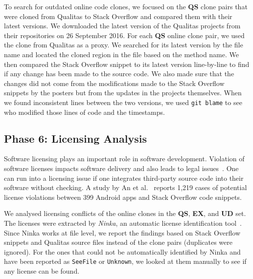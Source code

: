 \documentclass[sigconf,review, anonymous]{acmart}
\begin{document}
To search for outdated online code clones, we focused on the
\textbf{QS} clone pairs that were cloned from Qualitas to Stack
Overflow and compared them with their latest versions. We downloaded
the latest version of the Qualitas projects from their repositories on
26 September 2016. For each \textbf{QS} online clone pair, we used the
clone from Qualitas as a proxy. We searched for its latest version by
the file name and located the cloned region in the file based on the
method name.
We then compared the Stack Overflow snippet to its latest version
line-by-line to find if any change has been made to the source
code. We also made sure that the changes did not come from the
modifications made to the Stack Overflow snippets by the posters but
from the updates in the projects themselves. When we found
inconsistent lines between the two versions, we used
{\small\texttt{git blame}} to see who modified those lines of code and
the timestamps.

\subsection{Phase 6: Licensing Analysis}
Software licensing plays an important role in software
development. Violation of software licenses impacts software delivery
and also leads to legal issues~\cite{Sprigman2015}.
One can run into a licensing issue if one integrates third-party
source code into their software without checking. A study by An et
al.~\cite{An2017} reports 1,219 cases of potential license violations
between 399 Android apps and Stack Overflow code
snippets.

We analysed licensing conflicts of the online clones in the
\textbf{QS}, \textbf{EX}, and \textbf{UD} set. The
licenses were extracted by \emph{Ninka}, an automatic license
identification tool~\cite{German2010}. Since Ninka works at file
level, we report the findings based on Stack Overflow snippets and
Qualitas source files instead of the clone pairs (duplicates were
ignored). For the ones that could not be automatically identified by
Ninka and have been reported as {\small\texttt{SeeFile}} or
{\small\texttt{Unknown}}, we looked at them manually to see if any
license can be found. 

\end{document}
